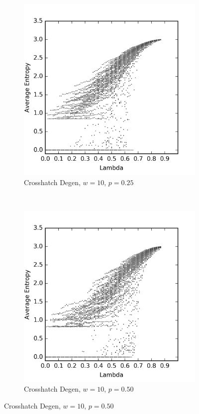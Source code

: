 \documentclass[a4paper,11pt]{article}
\begin{document}
\begin{figure}[htp]
\centering
\begin{subfigure}[t]{0.4\textwidth}
  \includegraphics[width=\textwidth]{ch6_figs/ch_w10_p25_entropy_scatter}
  \caption{Crosshatch Degen, $w=10$, $p=0.25$}

\end{subfigure}
~
\begin{subfigure}[t]{0.4\textwidth}
  \centering
  \includegraphics[width=\textwidth]{ch6_figs/ch_w10_p50_entropy_scatter}
  \caption{Crosshatch Degen, $w=10$, $p=0.50$}


\end{subfigure}
\end{figure}
\end{document}
